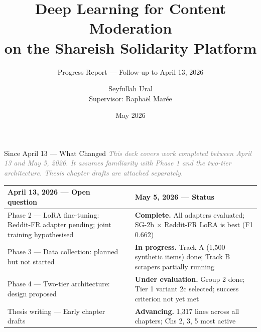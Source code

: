 \documentclass[aspectratio=169, 12pt]{beamer}
\title{Deep Learning for Content Moderation\\on the Shareish Solidarity Platform}
\subtitle{Progress Report --- Follow-up to April 13, 2026}
\author{Seyfullah Ural\\[4pt]\small Supervisor: Raphaël Marée}
\institute{University of Liège}
\date{May 2026}
\newcommand{\good}[1]{\textcolor{okgreen}{\textbf{#1}}}
\newcommand{\warn}[1]{\textcolor{warnorange}{\textbf{#1}}}
\begin{document}
\maketitle

\begin{frame}[shrink=25]{Since April 13 --- What Changed}
  \textit{\textcolor{gray}{This deck covers work completed between April 13 and May 5, 2026. It assumes
  familiarity with Phase 1 and the two-tier architecture. Thesis chapter drafts are attached separately.}}\\[6pt]
  \small
  \begin{tabular}{p{} p{} p{}}
    \textbf{April 13, 2026 --- Open question} & & \textbf{May 5, 2026 --- Status} \\
    \midrule
    Phase 2 --- LoRA fine-tuning: Reddit-FR adapter pending; joint training hypothesised
    & &
    \good{Complete.} All adapters evaluated; SG-2b $\times$ Reddit-FR LoRA is best (F1 0.662) \\[6pt]

    Phase 3 --- Data collection: planned but not started
    & &
    \warn{In progress.} Track A (1,500 synthetic items) done; Track B scrapers partially running \\[6pt]

    Phase 4 --- Two-tier architecture: design proposed
    & &
    \warn{Under evaluation.} Group 2 done; Tier 1 variant 2c selected; success criterion not yet met \\[6pt]

    Thesis writing --- Early chapter drafts
    & &
    \warn{Advancing.} 1,317 lines across all chapters; Chs 2, 3, 5 most active \\
  \end{tabular}
\end{frame}
\end{document}
